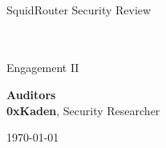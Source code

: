 \begin{titlepage}
  \vbox{}
  \vbox{}

  \begin{center}


    \noindent\makebox[\linewidth]{\rule{.7\paperwidth}{.6pt}}\\[0.7cm]

    { \huge \bfseries

      SquidRouter Security Review
    }\\[0.25cm]
    
    \noindent\makebox[\linewidth]{\rule{.7\paperwidth}{.6pt}}\\[0.7cm]

    \large{Engagement II
    }\\[1.2 cm]
    
    \vfill
    
    \large
    {\bfseries Auditors}\\
    
    {\bfseries0xKaden}, Security Researcher \\

    \vspace{5cm}

    {\large \today}

  \end{center}

\end{titlepage}